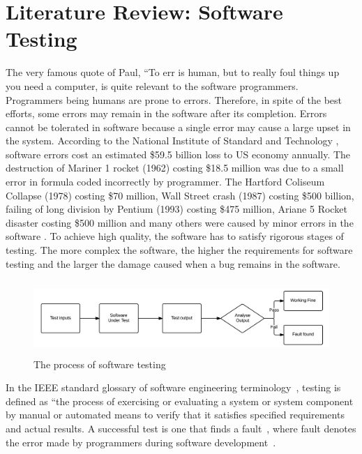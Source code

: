 \chapter{Literature Review: Software Testing}
\label{chap:softwareTesting}
The very famous quote of Paul, ``To err is human, but to really foul things up you need a computer, is quite relevant to the software programmers. Programmers being humans are prone to errors. Therefore, in spite of the best efforts, some errors may remain in the software after its completion.  Errors cannot be tolerated in software because a single error may cause a large upset in the system. According to the National Institute of Standard and Technology \cite{Tassey2002}, software errors cost an estimated \$59.5 billion loss to US economy annually. The destruction of Mariner 1 rocket (1962) costing \$18.5 million was due to a small error in formula coded incorrectly by programmer. The Hartford Coliseum Collapse (1978) costing \$70 million, Wall Street crash (1987) costing \$500 billion, failing of long division by Pentium (1993) costing \$475 million, Ariane 5 Rocket disaster costing \$500 million and many others were caused by minor errors in the software \cite{toweysoftware}. To achieve high quality, the software has to satisfy rigorous stages of testing. The more complex the software, the higher the requirements for software testing and the larger the damage caused when a bug remains in the software.

\begin{figure}[h]
	\centering
	\includegraphics[width=13cm, height=2.8cm]{chapter2/softwareTesting.png}
	\caption{The process of software testing}
	\label{fig:softwareTesting}
\end{figure}

In the IEEE standard glossary of software engineering terminology~\cite{american1984}, testing is defined as ``the process of exercising or evaluating a system or system component by manual or automated means to verify that it satisfies specified requirements and actual results. A successful test is one that finds a fault~\cite{Myers1979}, where fault denotes the error made by programmers during software development~\cite{american1984}.

